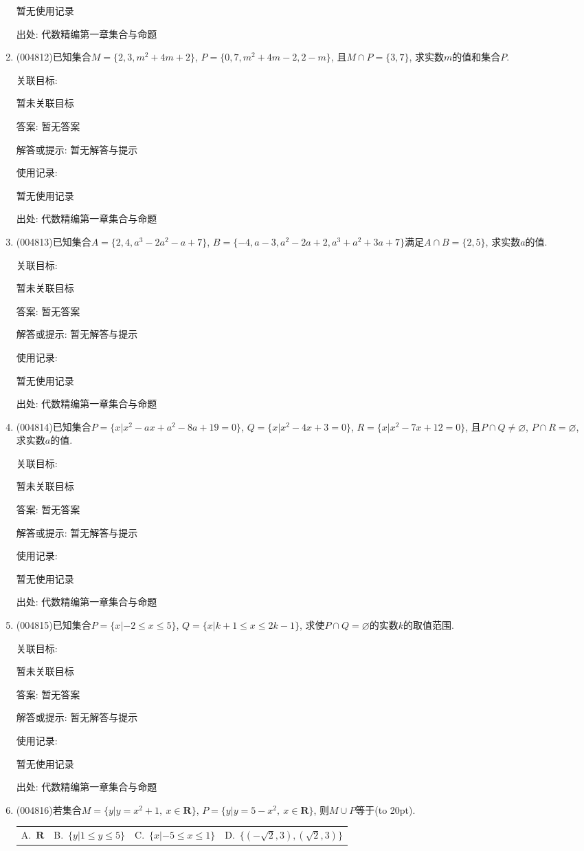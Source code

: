 \documentclass[10pt,a4paper]{article}
\newcommand{\bracket}[1]{(\hbox to #1pt{})}
\newcommand{\fourch}[4]{\par\begin{tabular}{p{.23\textwidth}p{.23\textwidth}p{.23\textwidth}p{.23\textwidth}}
A.~#1 &B.~#2& C.~#3& D.~#4
\end{tabular}}
\begin{document}
\begin{enumerate}[1.]
暂无使用记录


出处: 代数精编第一章集合与命题
\item { (004812)}已知集合$M=\{2,3,m^2+4m+2\}$, $P=\{0,7,m^2+4m-2,2-m\}$, 且$M\cap P=\{3,7\}$, 求实数$m$的值和集合$P$.


关联目标:

暂未关联目标

答案: 暂无答案

解答或提示: 暂无解答与提示

使用记录:

暂无使用记录


出处: 代数精编第一章集合与命题
\item { (004813)}已知集合$A=\{2,4,a^3-2a^2-a+7\}$, $B=\{-4,a-3,a^2-2a+2,a^3+a^2+3a+7\}$满足$A\cap B=\{2,5\}$, 求实数$a$的值.


关联目标:

暂未关联目标

答案: 暂无答案

解答或提示: 暂无解答与提示

使用记录:

暂无使用记录


出处: 代数精编第一章集合与命题
\item { (004814)}已知集合$P=\{x|x^2-ax+a^2-8a+19=0\}$, $Q=\{x|x^2-4x+3=0\}$, $R=\{x|x^2-7x+12=0\}$, 且$P\cap Q\ne \varnothing$, $P\cap R=\varnothing$, 求实数$a$的值.


关联目标:

暂未关联目标

答案: 暂无答案

解答或提示: 暂无解答与提示

使用记录:

暂无使用记录


出处: 代数精编第一章集合与命题
\item { (004815)}已知集合$P=\{x|-2\le x\le 5\}$, $Q=\{x|k+1\le x\le 2k-1\}$, 求使$P\cap Q=\varnothing$的实数$k$的取值范围.


关联目标:

暂未关联目标

答案: 暂无答案

解答或提示: 暂无解答与提示

使用记录:

暂无使用记录


出处: 代数精编第一章集合与命题
\item { (004816)}若集合$M=\{y|y=x^2+1, \ x\in \mathbf{R}\}$, $P=\{y|y=5-x^2, \ x\in \mathbf{R}\}$, 则$M\cup P$等于\bracket{20}.
\fourch{$\mathbf{R}$}{$\{y|1\le y\le 5\}$}{$\{x|-5\le x\le 1\}$}{$\{(-\sqrt 2,3),(\sqrt 2,3)\}$}



\end{enumerate}
\end{document}
